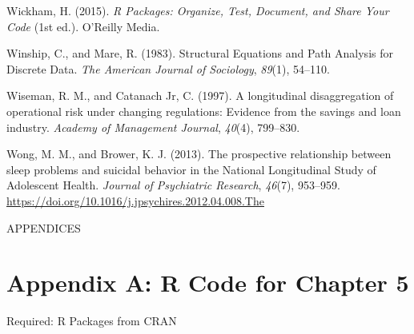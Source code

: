\documentclass[]{DissertateUSU}
\begin{document}
\hypertarget{ref-Wickham2015}{}
Wickham, H. (2015). \emph{R Packages: Organize, Test, Document, and
Share Your Code} (1st ed.). O'Reilly Media.

\hypertarget{ref-Winship1983}{}
Winship, C., and Mare, R. (1983). Structural Equations and Path Analysis
for Discrete Data. \emph{The American Journal of Sociology},
\emph{89}(1), 54--110.

\hypertarget{ref-wiseman1997longitudinal}{}
Wiseman, R. M., and Catanach Jr, C. (1997). A longitudinal
disaggregation of operational risk under changing regulations: Evidence
from the savings and loan industry. \emph{Academy of Management
Journal}, \emph{40}(4), 799--830.

\hypertarget{ref-Wong2013}{}
Wong, M. M., and Brower, K. J. (2013). The prospective relationship
between sleep problems and suicidal behavior in the National
Longitudinal Study of Adolescent Health. \emph{Journal of Psychiatric
Research}, \emph{46}(7), 953--959.
\url{https://doi.org/10.1016/j.jpsychires.2012.04.008.The}

\clearpage
{} 
\fancyhead[R]{\thepage} \fancyfoot[C]{}

\vspace*{\fill}

\begin{center}
    APPENDICES 
  \end{center}

\vspace*{\fill}

\clearpage

\doublespacing

\section*{Appendix A: R Code for Chapter
5}\label{appendix-a-r-code-for-chapter-5}

\singlespace

Required: R Packages from CRAN

\small
\end{document}
